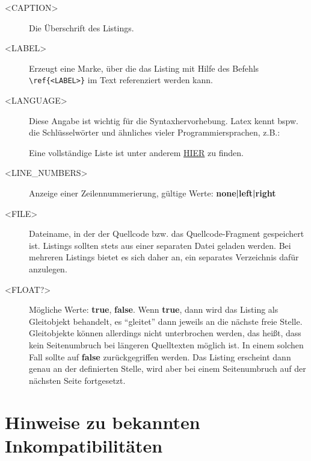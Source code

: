 \begin{description}
	\item[\textless CAPTION\textgreater] Die Überschrift des Listings.
	\item[\textless LABEL\textgreater] Erzeugt eine Marke, über die das Listing mit Hilfe des
	Befehls \verb|\ref{<LABEL>}| im Text referenziert werden kann.
	\item[\textless LANGUAGE\textgreater] Diese Angabe ist wichtig für die Syntaxhervorhebung. Latex kennt bspw. die Schlüsselwörter und ähnliches vieler Programmiersprachen, z.B.:
		Eine vollständige Liste ist unter anderem \href{http://en.wikibooks.org/wiki/LaTeX/Packages/Listings}{HIER} zu finden.
	\item[\textless LINE\_NUMBERS\textgreater] Anzeige einer Zeilennummerierung, gültige Werte: {\bfseries none|left|right}
	\item[\textless FILE\textgreater] Dateiname, in der der Quellcode bzw. das Quellcode-Fragment gespeichert ist. Listings sollten stets aus einer separaten Datei geladen werden. Bei mehreren Listings bietet es sich daher an, ein separates Verzeichnis dafür anzulegen.
	\item[\textless FLOAT?\textgreater] Mögliche Werte: \textbf{true}, \textbf{false}. Wenn \textbf{true}, dann wird das Listing als Gleitobjekt behandelt, es "`gleitet"' dann jeweils an die nächste freie Stelle. Gleitobjekte können allerdings nicht unterbrochen werden, das heißt, dass kein Seitenumbruch bei längeren Quelltexten möglich ist. In einem solchen Fall sollte auf \textbf{false} zurückgegriffen werden. Das Listing erscheint dann genau an der definierten Stelle, wird aber bei einem Seitenumbruch auf der nächsten Seite fortgesetzt.
\end{description}

\section{Hinweise zu bekannten Inkompatibilitäten}
\label{sec:Inkompatibilitaeten}

